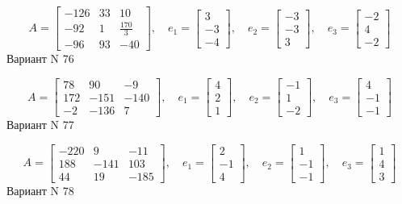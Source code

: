 \documentclass[11pt]{report}
\begin{document}
$$A = \left[\begin{matrix}-126 & 33 & 10\\-92 & 1 & \frac{170}{3}\\-96 & 93 & -40\end{matrix}\right],\quad e_1 = \left[\begin{matrix}3\\-3\\-4\end{matrix}\right],\quad e_2 = \left[\begin{matrix}-3\\-3\\3\end{matrix}\right],\quad e_3 = \left[\begin{matrix}-2\\4\\-2\end{matrix}\right]$$Вариант N 76

$$A = \left[\begin{matrix}78 & 90 & -9\\172 & -151 & -140\\-2 & -136 & 7\end{matrix}\right],\quad e_1 = \left[\begin{matrix}4\\2\\1\end{matrix}\right],\quad e_2 = \left[\begin{matrix}-1\\1\\-2\end{matrix}\right],\quad e_3 = \left[\begin{matrix}4\\-1\\-1\end{matrix}\right]$$Вариант N 77

$$A = \left[\begin{matrix}-220 & 9 & -11\\188 & -141 & 103\\44 & 19 & -185\end{matrix}\right],\quad e_1 = \left[\begin{matrix}2\\-1\\4\end{matrix}\right],\quad e_2 = \left[\begin{matrix}1\\-1\\-1\end{matrix}\right],\quad e_3 = \left[\begin{matrix}1\\4\\3\end{matrix}\right]$$Вариант N 78
\end{document}
